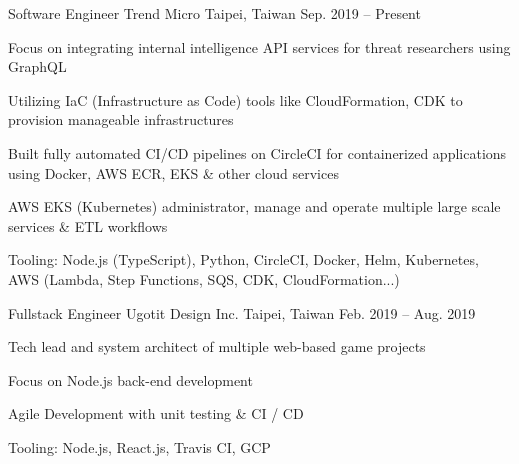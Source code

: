 

\begin{cventries}

  \cventry
    {Software Engineer} %
    {Trend Micro} %
    {Taipei, Taiwan} %
    {Sep. 2019 -- Present} %
    {
      \begin{cvitems} %
        \item {Focus on integrating internal intelligence API services for threat researchers using GraphQL}
        \item {Utilizing IaC (Infrastructure as Code) tools like CloudFormation, CDK to provision manageable infrastructures}
        \item {Built fully automated CI/CD pipelines on CircleCI for containerized applications using Docker, AWS ECR, EKS \& other cloud services}
        \item {AWS EKS (Kubernetes) administrator, manage and operate multiple large scale services \& ETL workflows}
        \item {Tooling: Node.js (TypeScript), Python, CircleCI, Docker, Helm, Kubernetes, AWS (Lambda, Step Functions, SQS, CDK, CloudFormation...)}
      \end{cvitems}
    }

  \cventry
    {Fullstack Engineer} %
    {Ugotit Design Inc.} %
    {Taipei, Taiwan} %
    {Feb. 2019 -- Aug. 2019} %
    {
      \begin{cvitems} %
        \item {Tech lead and system architect of multiple web-based game projects}
        \item {Focus on Node.js back-end development}
        \item {Agile Development with unit testing \& CI / CD}
        \item {Tooling: Node.js, React.js, Travis CI, GCP}
      \end{cvitems}
    }

\end{cventries}
